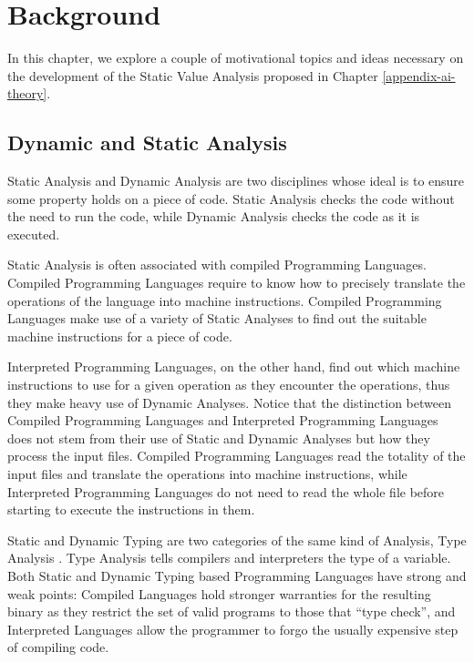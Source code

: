 \chapter{Background}\label{background}

In this chapter, we explore a couple of motivational topics and ideas
necessary on the development of the Static Value Analysis proposed in
Chapter \ref{appendix-ai-theory}.

\section{Dynamic and Static Analysis}%
\label{dynamic-and-static-analysis}

Static Analysis and Dynamic Analysis are two
disciplines{} whose ideal is to ensure some property
holds on a piece of code. Static Analysis checks the code without the
need to run the code, while Dynamic Analysis checks the code as it is
executed.

Static Analysis is often associated with compiled Programming Languages.
Compiled Programming Languages require to know how to precisely
translate the operations of the language into machine instructions.
Compiled Programming Languages make use of a variety of Static Analyses
to find out the suitable machine instructions for a piece of code.

Interpreted Programming Languages, on the other hand, find out which
machine instructions to use for a given operation as they encounter the
operations, thus they make heavy use of Dynamic Analyses. Notice that
the distinction between Compiled Programming Languages and Interpreted
Programming Languages does not stem from their use of Static and Dynamic
Analyses but how they process the input files. Compiled Programming
Languages read the totality of the input files and translate the
operations into machine instructions, while Interpreted Programming
Languages do not need to read the whole file before starting to execute
the instructions in them.

Static and Dynamic Typing are two categories of the same kind of
Analysis, Type Analysis \autocite{pierce_types_2002}. Type Analysis
tells compilers and interpreters the type of a variable. Both Static and
Dynamic Typing based Programming Languages have strong and weak points:
Compiled Languages hold stronger warranties for the resulting binary as
they restrict the set of valid programs to those that \enquote{type
check}, and Interpreted Languages allow the programmer to forgo the
usually expensive step of compiling code.

